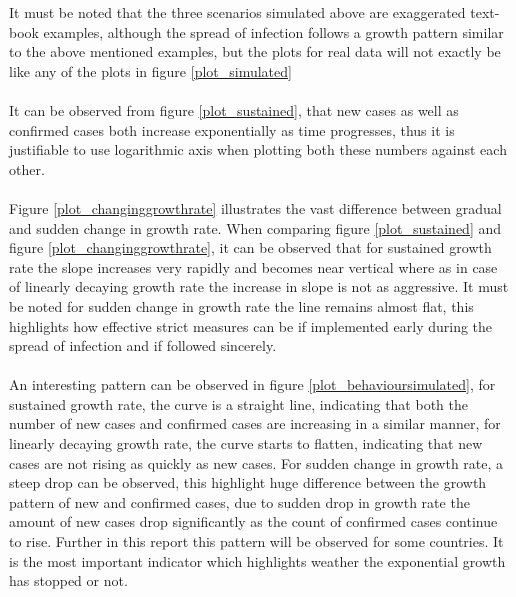 \documentclass[12pt, twosided]{report}  %
\begin{document}
It must be noted that the three scenarios simulated above are exaggerated text-book examples, although the spread of infection follows a growth pattern similar to the above mentioned examples, but the plots for real data will not exactly be like any of the plots in figure \ref{plot_simulated}
\\
\\
It can be observed from figure \ref{plot_sustained}, that new cases as well as confirmed cases both increase exponentially as time progresses, thus it is justifiable to use logarithmic axis when plotting both these numbers against each other.
\\
\\
Figure \ref{plot_changinggrowthrate} illustrates the vast difference between gradual and sudden change in growth rate. When comparing figure \ref{plot_sustained} and figure \ref{plot_changinggrowthrate}, it can be observed that for sustained growth rate the slope increases very rapidly and becomes near vertical where as in case of linearly decaying growth rate the increase in slope is not as aggressive. It must be noted for sudden change in growth rate the line remains almost flat, this highlights how effective strict measures can be if implemented early during the spread of infection and if followed sincerely.
\\
\\
An interesting pattern can be observed in figure \ref{plot_behavioursimulated}, for sustained growth rate, the curve is a straight line, indicating that both the number of new cases and confirmed cases are increasing in a similar manner, for linearly decaying growth rate, the curve starts to flatten, indicating that new cases are not rising as quickly as new cases. For sudden change in growth rate, a steep drop can be observed, this highlight huge difference between the growth pattern of new and confirmed cases, due to sudden drop in growth rate the amount of new cases drop significantly as the count of confirmed cases continue to rise. Further in this report this pattern will be observed for some countries. It is the most important indicator which highlights weather the exponential growth has stopped or not.
\pagebreak
\end{document}
